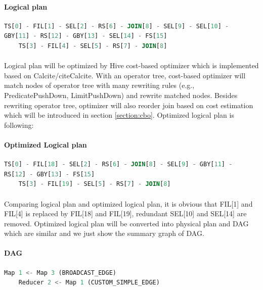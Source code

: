         \paragraph*{Logical plan}
        \begin{lstlisting}[language={SQL},%frame=shadowbox,    
            keywordstyle=\color{blue!30!black},  
            basicstyle=\ttfamily]  
    TS[0] - FIL[1] - SEL[2] - RS[6] - JOIN[8] - SEL[9] - SEL[10] - 
GBY[11] - RS[12] - GBY[13] - SEL[14] - FS[15]
    TS[3] - FIL[4] - SEL[5] - RS[7] - JOIN[8]
        \end{lstlisting}
        \paragraph{}
        Logical plan will be optimized by Hive cost-based optimizer which is implemented based on Calcite/cite{Calcite}. With an operator tree, 
        cost-based optimizer will match nodes of operator tree with many rewriting rules (e.g., PredicatePushDown, LimitPushDown) and rewrite matched nodes. 
        Besides rewriting operator tree, optimizer will also reorder join based on cost estimation which will be introduced in section \ref{section:cbo}.
        Optimized logical plan is following:
        \paragraph*{Optimized Logical plan}
        \begin{lstlisting}[language={SQL},%frame=shadowbox,    
            keywordstyle=\color{blue!30!black},  
            basicstyle=\ttfamily]  
    TS[0] - FIL[18] - SEL[2] - RS[6] - JOIN[8] - SEL[9] - GBY[11] - 
RS[12] - GBY[13] - FS[15]
    TS[3] - FIL[19] - SEL[5] - RS[7] - JOIN[8]
        \end{lstlisting} 
        \paragraph{}
        Comparing logical plan and optimized logical plan, it is obvious that FIL[1] and FIL[4] is replaced by 
        FIL[18] and FIL[19], redundant SEL[10] and SEL[14] are removed. Optimized logical plan will be converted
        into physical plan and DAG which are similar and we just show the summary graph of DAG.
        \paragraph*{DAG}
        \begin{lstlisting}[language={SQL},%frame=shadowbox,    
            keywordstyle=\color{blue!30!black},  
            basicstyle=\ttfamily]  
    Map 1 <- Map 3 (BROADCAST_EDGE)
    Reducer 2 <- Map 1 (CUSTOM_SIMPLE_EDGE)
        \end{lstlisting} 
